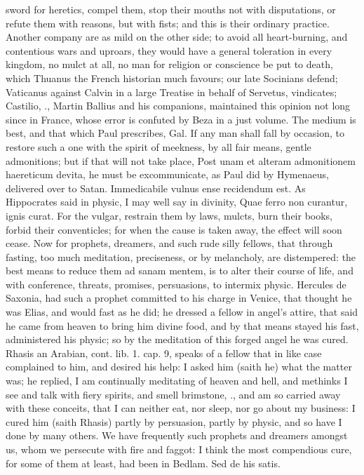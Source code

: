 {sword for heretics, compel them, stop their mouths not with
disputations, or refute them with reasons, but with fists; and this is
their ordinary practice. Another company are as mild on the other side;
to avoid all heart-burning, and contentious wars and uproars, they
would have a general toleration in every kingdom, no mulct at all, no
man for religion or conscience be put to death, which Thuanus the
French historian much favours; our late Socinians defend; Vaticanus
against Calvin in a large Treatise in behalf of Servetus, vindicates;
Castilio, \etc{}., Martin Ballius and his companions, maintained this
opinion not long since in France, whose error is confuted by Beza in a
just volume. The medium is best, and that which Paul prescribes, Gal.
 If any man shall fall by occasion, to restore such a one with the
spirit of meekness, by all fair means, gentle admonitions; but if that
will not take place, Post unam et alteram admonitionem haereticum
devita, he must be excommunicate, as Paul did by Hymenaeus, delivered
over to Satan. Immedicabile vulnus ense recidendum est. As Hippocrates
said in physic, I may well say in divinity, Quae ferro non curantur,
ignis curat. For the vulgar, restrain them by laws, mulcts, burn their
books, forbid their conventicles; for when the cause is taken away, the
effect will soon cease. Now for prophets, dreamers, and such rude silly
fellows, that through fasting, too much meditation, preciseness, or by
melancholy, are distempered: the best means to reduce them ad sanam
mentem, is to alter their course of life, and with conference, threats,
promises, persuasions, to intermix physic. Hercules de Saxonia, had
such a prophet committed to his charge in Venice, that thought he was
Elias, and would fast as he did; he dressed a fellow in angel's attire,
that said he came from heaven to bring him divine food, and by that
means stayed his fast, administered his physic; so by the meditation of
this forged angel he was cured. Rhasis an Arabian, cont. lib. 1.
cap. 9, speaks of a fellow that in like case complained to him, and
desired his help: I asked him (saith he) what the matter was; he
replied, I am continually meditating of heaven and hell, and methinks I
see and talk with fiery spirits, and smell brimstone, \etc{}., and am so
carried away with these conceits, that I can neither eat, nor sleep,
nor go about my business: I cured him (saith Rhasis) partly by
persuasion, partly by physic, and so have I done by many others. We
have frequently such prophets and dreamers amongst us, whom we
persecute with fire and faggot: I think the most compendious cure, for
some of them at least, had been in Bedlam. Sed de his satis.

}
